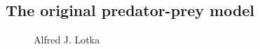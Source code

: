 \documentclass[
  letterpaper,
  DIV=11,
  numbers=noendperiod]{scrartcl}
\begin{document}
\hypertarget{the-original-predator-prey-model-2}{%
\subsection{The original predator-prey
model}\label{the-original-predator-prey-model-2}}

\begin{figure}

\begin{minipage}[t]{0.33\linewidth}

{\centering 


\caption{Alfred J. Lotka}

}

\end{minipage}%
%
\begin{minipage}[t]{0.33\linewidth}

{\centering 

}
\end{minipage}
\end{figure}
\end{document}
